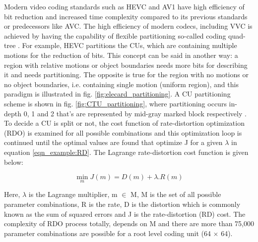 \documentclass{article}
\begin{document}
Modern video coding standards such as HEVC \cite{H.265} and AV1 \cite{AV1} have high efficiency of bit reduction and increased time complexity compared to its previous standards or predecessors like AVC. The high efficiency of modern codecs, including VVC is achieved by having the capability of flexible partitioning so-called coding quad-tree \cite{kim2012block}. For example, HEVC partitions the CUs, which are containing multiple motions for the reduction of bits. This concept can be said in another way: a region with relative motions or object boundaries needs more bits for describing it and needs partitioning. The opposite is true for the region with no motions or no object boundaries, i.e. containing single motion (uniform region), and this paradigm is illustrated in fig. \ref{fig:elecard_partitioning}. A CU partitioning scheme is shown in fig. \ref{fig:CTU_partitioning}, where partitioning occurs in-depth 0, 1 and 2 that's are represented by mid-gray marked block respectively \cite{H.265}. To decide a CU is split or not, the cost function of rate-distortion optimization (RDO) is examined for all possible combinations and this optimization loop is continued until the optimal values are found that optimize J for a given $\lambda$ in equation \ref{eqn_example:RD}. The Lagrange rate-distortion cost function is given below:

\begin{equation}
\label{eqn_example:RD}
\min_{m} J(m) = D(m) + \lambda . R(m)
\end{equation}

Here, $\lambda$ is the Lagrange multiplier, m $\in$ M, M is the set of all possible parameter combinations, R is the rate, D is the distortion which is commonly known as the sum of squared errors and J is the rate-distortion (RD) cost. The complexity of RDO process totally, depends on M and there are more than 75,000 parameter combinations are possible for a root level coding unit (64 $\times$ 64). \\
\end{document}
